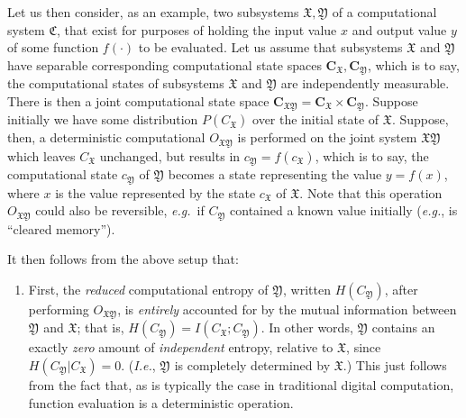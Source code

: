 \documentclass[preprints,article,accept,moreauthors,pdftex]{Definitions/mdpi}
\begin{document}
\begin{paracol}{2}
Let us then consider, as an example, two subsystems $\mathfrak{X},\mathfrak{Y}$ of a computational system $\mathfrak{C}$, that exist for purposes of holding the input value $x$ and output value $y$ of some function $f(\cdot)$ to be evaluated. Let us assume that subsystems $\mathfrak{X}$ and $\mathfrak{Y}$ have separable corresponding computational state spaces $\boldsymbol{C}_\mathfrak{X}, \boldsymbol{C}_\mathfrak{Y}$, which is to say, the computational states of subsystems $\mathfrak{X}$ and $\mathfrak{Y}$ are independently measurable. There is then a joint computational state space $\boldsymbol{C}_{\mathfrak{XY}} = \boldsymbol{C}_\mathfrak{X}\times\boldsymbol{C}_\mathfrak{Y}$. Suppose initially we have some distribution $P(C_\mathfrak{X})$ over the initial state of $\mathfrak{X}$. Suppose, then, a deterministic computational $O_{\mathfrak{XY}}$ is performed on the joint system $\mathfrak{XY}$ which leaves $C_\mathfrak{X}$ unchanged, but results in $c_\mathfrak{Y}=f(c_\mathfrak{X})$, which is to say, the computational state $c_\mathfrak{Y}$ of $\mathfrak{Y}$ becomes a state representing the value $y=f(x)$, where $x$ is the value represented by the state $c_\mathfrak{X}$ of $\mathfrak{X}$. Note that this operation $O_{\mathfrak{XY}}$ could also be reversible, \emph{e.g.}\ if $C_\mathfrak{Y}$ contained a known value initially (\emph{e.g.}, is ``cleared memory'').

It then follows from the above setup that:

\begin{enumerate}
    \item First, the \emph{reduced} computational entropy of $\mathfrak{Y}$, written $H(C_\mathfrak{Y})$, after performing $O_{\mathfrak{XY}}$, is \emph{entirely} accounted for by the mutual information between $\mathfrak{Y}$ and $\mathfrak{X}$; that is, $H(C_\mathfrak{Y}) = I(C_\mathfrak{X};C_\mathfrak{Y})$. In other words, $\mathfrak{Y}$ contains an exactly \emph{zero} amount of \emph{independent} entropy, relative to $\mathfrak{X}$, since $H(C_\mathfrak{Y}|C_\mathfrak{X}) = 0$. (\emph{I.e.}, $\mathfrak{Y}$ is completely determined by $\mathfrak{X}$.) This just follows from the fact that, as is typically the case in traditional digital computation, function evaluation is a deterministic operation.
    

\end{enumerate}
\end{paracol}
\end{document}
